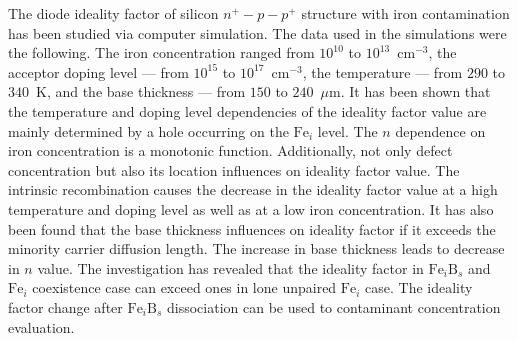 ﻿\documentclass[12pt]{article}
\begin{document}
The diode ideality factor of silicon $n^+-p-p^+$ structure with iron contamination has been studied via computer simulation.
The data used in the simulations were the following.
The iron concentration ranged from $10^{10}$ to $10^{13}$~cm$^{-3}$,
the acceptor doping level --- from $10^{15}$ to $10^{17}$~cm$^{-3}$,
the temperature --- from $290$ to $340$~K,
and the base thickness --- from $150$ to $240$~$\mu$m.
It has been shown that the temperature and doping level dependencies of the ideality factor value
are mainly determined by a hole occurring on the $\mathrm{Fe}_i$ level.
The $n$ dependence on iron concentration is a monotonic function.
Additionally, not only defect concentration but also its location influences on  ideality factor value.
The intrinsic recombination causes the decrease in the ideality factor value at a high temperature and doping level as well as at a low iron concentration.
It has also been found that the base thickness influences on ideality factor if it exceeds the minority carrier diffusion length.
The increase in base thickness leads to decrease in $n$ value.
The investigation has revealed that the ideality factor in $\mathrm{Fe}_i\mathrm{B}_s$ and $\mathrm{Fe}_i$ coexistence case
can exceed ones in lone unpaired $\mathrm{Fe}_i$ case.
The ideality factor change after $\mathrm{Fe}_i\mathrm{B}_s$ dissociation can be used to contaminant concentration evaluation.


\end{document}
